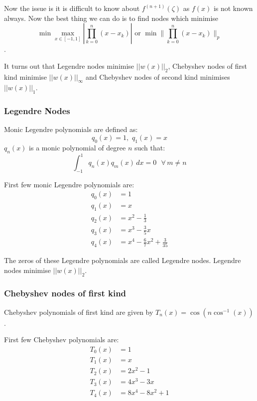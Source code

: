 \documentclass[
]{book}
\begin{document}
Now the issue is it is difficult to know about \(f^{(n+1)}(\zeta)\) as \(f(x)\) is not known always. Now the best thing we can do is to find nodes which minimise \[\min \max_{x\in[-1,1]}\left|\prod_{k=0}^n(x-x_k)\right| \text{ or } \min \lVert \prod_{k=0}^n(x-x_k) \rVert_p\].

It turns out that Legendre nodes minimise \(||w(x)||_2\), Chebyshev nodes of first kind minimise \(||w(x)||_{\infty}\) and Chebyshev nodes of second kind minimises \(||w(x)||_1\).

\hypertarget{legendre-nodes}{%
\subsubsection{Legendre Nodes}\label{legendre-nodes}}

Monic Legendre polynomials are defined as:
\[q_0(x) = 1, \, \, q_1(x) = x\]
\(q_n(x)\) is a monic polynomial of degree \(n\) such that:
\begin{equation}
\int_{-1}^1 q_n(x) q_m(x) \, dx = 0 \ \  \ \forall \,  m\neq n
\end{equation}

First few monic Legendre polynomials are:
\begin{align*}
  q_0(x) &= 1\\
  q_1(x) &= x\\
  q_2(x) &= x^2-\frac{1}{3}\\
  q_3(x) &= x^3-\frac{3}{5}x\\
  q_4(x) &= x^4- \frac{6}{7}x^2+\frac{3}{35}
\end{align*}

The zeros of these Legendre polynomials are called Legendre nodes. Legendre nodes minimise \(||w(x)||_2\).

\hypertarget{chebyshev-nodes-of-first-kind}{%
\subsubsection{Chebyshev nodes of first kind}\label{chebyshev-nodes-of-first-kind}}

Chebyshev polynomials of first kind are given by \(T_n(x) = \cos(n\cos^{-1}(x))\).

First few Chebyshev polynomials are:
\begin{align}
T_0(x) &= 1\\
T_1(x) &= x\\
T_2(x) &= 2x^2-1\\
T_3(x) &= 4x^3-3x\\
T_4(x) &= 8x^4-8x^2+1
\end{align}
\end{document}
